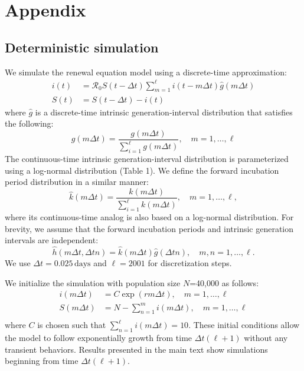 \documentclass[12pt]{article}
\newcommand{\Rx}[1]{\ensuremath{{\mathcal R}_{#1}}\xspace}
\newcommand{\Ro}{\Rx{0}}
\newcommand{\gdist}{g} %
\begin{document}
\pagebreak

\section{Appendix}

\subsection{Deterministic simulation}

We simulate the renewal equation model using a discrete-time approximation:
\begin{equation}
\begin{aligned}
i(t) &= \Ro S(t-\Delta t) \sum_{m=1}^{\ell} i(t-m \Delta t) \hat{\gdist}(m \Delta t) \\
S(t) &= S(t-\Delta t) - i(t)
\end{aligned}
\end{equation}
where $\hat{\gdist}$ is a discrete-time intrinsic generation-interval distribution that satisfies the following:
\begin{equation}
\hat{\gdist}(m \Delta t) = \frac{\gdist(m \Delta t)}{\sum_{i=1}^\ell \gdist(m \Delta t)}, \quad m=1, \dots, \ell
\end{equation}
The continuous-time intrinsic generation-interval distribution is parameterized using a log-normal distribution (Table 1). We define the forward incubation period distribution in a similar manner:
\begin{equation}
\hat{k}(m \Delta t) = \frac{k(m \Delta t)}{\sum_{i=1}^\ell k(m \Delta t)}, \quad m=1, \dots, \ell,
\end{equation}
where its continuous-time analog is also based on a log-normal distribution.
For brevity, we assume that the forward incubation periods and intrinsic generation intervals are independent:
\begin{equation}
\hat{h}(m \Delta t, \Delta t n) = \hat{k}(m \Delta t)\hat{\gdist}(\Delta t n), \quad m,n=1, \dots, \ell.
\end{equation}
We use $\Delta t = 0.025\,\textrm{days}$ and $\ell=2001$ for discretization steps.

We initialize the simulation with population size $N$=40,000 as follows:
\begin{equation}
\begin{aligned}
i(m \Delta t) &= C \exp(r m \Delta t), \quad m=1, \dots, \ell\\
S(m \Delta t) &= N - \sum_{n=1}^m i(m \Delta t), \quad m=1, \dots, \ell\\
\end{aligned}
\end{equation}
where $C$ is chosen such that $\sum_{n=1}^\ell i(m \Delta t)=10$.
These initial conditions allow the model to follow exponentially growth from time $\Delta t (\ell + 1)$ without any transient behaviors.
Results presented in the main text show simulations beginning from time $\Delta t (\ell + 1)$.
\end{document}
